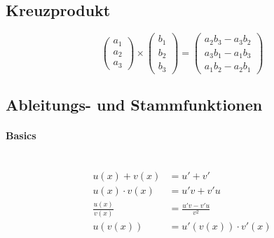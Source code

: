 \documentclass[a4paper,10pt]{article}
\begin{document}
\subsection{Kreuzprodukt}
\[
    \begin{pmatrix}
        a_1 \\ a_2 \\ a_3
    \end{pmatrix} \times \begin{pmatrix}
        b_1 \\ b_2 \\ b_3
    \end{pmatrix} = \begin{pmatrix}
        a_2b_3 - a_3b_2 \\
        a_3b_1 - a_1b_3 \\
        a_1b_2 - a_2b_1
    \end{pmatrix}
\]


\subsection{Ableitungs- und Stammfunktionen}

\paragraph{Basics} \
\begin{align*}
    u(x) + v(x) &= u' + v' \\
    u(x) \cdot v(x) &= u'v + v'u \\
    \frac{u(x)}{v(x)} &= \frac{u'v - v'u}{v^2} \\
    u(v(x)) &= u'(v(x)) \cdot v'(x) \\
\end{align*}
\end{document}
